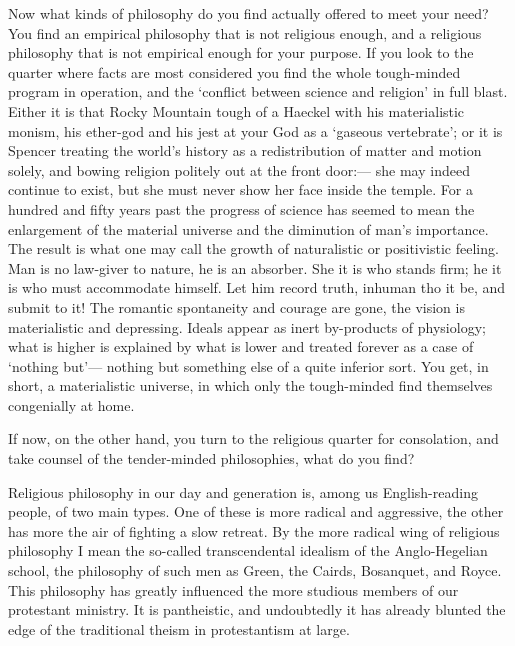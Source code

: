\documentclass[]{article}
\begin{document}
Now what kinds of philosophy do you find actually offered to meet your
need? You find an empirical philosophy that is not religious enough, and
a religious philosophy that is not empirical enough for your purpose.
If you look to the quarter where facts are most considered you find
the whole tough-minded program in operation, and the `conflict between
science and religion' in full blast. Either it is that Rocky Mountain
tough of a Haeckel with his materialistic monism, his ether-god and his
jest at your God as a `gaseous vertebrate'; or it is Spencer treating
the world's history as a redistribution of matter and motion solely, and
bowing religion politely out at the front door:--- she may indeed continue
to exist, but she must never show her face inside the temple. For a
hundred and fifty years past the progress of science has seemed to mean
the enlargement of the material universe and the diminution of man's
importance. The result is what one may call the growth of naturalistic
or positivistic feeling. Man is no law-giver to nature, he is an
absorber. She it is who stands firm; he it is who must accommodate
himself. Let him record truth, inhuman tho it be, and submit to it! The
romantic spontaneity and courage are gone, the vision is materialistic
and depressing. Ideals appear as inert by-products of physiology; what
is higher is explained by what is lower and treated forever as a case of
`nothing but'--- nothing but something else of a quite inferior sort. You
get, in short, a materialistic universe, in which only the tough-minded
find themselves congenially at home.

If now, on the other hand, you turn to the religious quarter for
consolation, and take counsel of the tender-minded philosophies, what do
you find?

Religious philosophy in our day and generation is, among us
English-reading people, of two main types. One of these is more radical
and aggressive, the other has more the air of fighting a slow retreat.
By the more radical wing of religious philosophy I mean the so-called
transcendental idealism of the Anglo-Hegelian school, the philosophy of
such men as Green, the Cairds, Bosanquet, and Royce. This philosophy has
greatly influenced the more studious members of our protestant ministry.
It is pantheistic, and undoubtedly it has already blunted the edge of
the traditional theism in protestantism at large.
\end{document}
